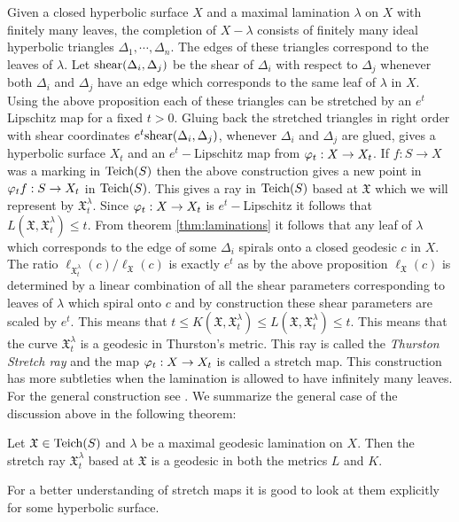 Given a closed hyperbolic surface $X$ and a maximal lamination $\lambda$ on $X$ with finitely many leaves, the completion of $X-\lambda$ consists of finitely many ideal hyperbolic triangles $\Delta_1,\cdots,\Delta_n$. The edges of these triangles correspond to the leaves of $\lambda$. Let $\text{shear}(\Delta_i, \Delta_j)$ be the shear of $\Delta_i$ with respect to $\Delta_j$ whenever both $\Delta_i$ and $\Delta_j$ have an edge which corresponds to the same leaf of $\lambda$ in $X$. Using the above proposition each of these triangles can be stretched by an $e^t$ Lipschitz map for a fixed $t>0$. Gluing back the stretched triangles in right order with shear coordinates $e^t \text{shear}(\Delta_i,\Delta_j)$, whenever $\Delta_i$ and $\Delta_j$ are glued, gives a hyperbolic surface $X_t$ and an $e^t-$Lipschitz map from $\varphi_t:X\to X_t$. If $f:S\to X$ was a marking in $\text{Teich}(S)$ then the above construction gives a new point in $\varphi_t f:S\to X_t$ in $\text{Teich}(S)$. This gives a ray in $\text{Teich}(S)$ based at $ \mathfrak{X}$ which we will represent by $ \mathfrak{X}^{\lambda}_t$. Since $\varphi_t:X\to X_t$ is $e^t-$Lipschitz it follows that $L( \mathfrak{X}, \mathfrak{X}^{\lambda}_t) \leq t$. From theorem \ref{thm:laminations} it follows that any leaf of $\lambda$ which corresponds to the edge of some $\Delta_i$ spirals onto a closed geodesic $c$ in $X$. The ratio $\ell_{ \mathfrak{X}^\lambda_t}(c)/ \ell_\mathfrak{X}(c)$ is exactly $e^t$ as by the above proposition $\ell_{ \mathfrak{X}}(c)$ is determined by a linear combination of all the shear parameters corresponding to leaves of $\lambda$ which spiral onto $c$ and by construction these shear parameters are scaled by $e^t$. This means that $t\leq K( \mathfrak{X}, \mathfrak{X}^\lambda_t) \leq L( \mathfrak{X}, \mathfrak{X}^\lambda_t) \leq t$. This means that the curve $ \mathfrak{X}^\lambda_t$ is a geodesic in Thurston's metric. This ray is called the \textit{Thurston Stretch ray} and the map $\varphi_t:X\to X_t$ is called a stretch map. This construction has more subtleties when the lamination is allowed to have infinitely many leaves. For the general construction see \cite{thurston}. We summarize the general case of the discussion above in the following theorem:
\begin{theorem}
  Let $\mathfrak{X}\in \text{Teich}(S)$ and $\lambda$ be a maximal geodesic lamination on $X$. Then the stretch ray $ \mathfrak{X}^\lambda_t$ based at $ \mathfrak{X}$ is a geodesic in both the metrics $L$ and $K$.
\end{theorem}
For a better understanding of stretch maps it is good to look at them explicitly for some hyperbolic surface.
